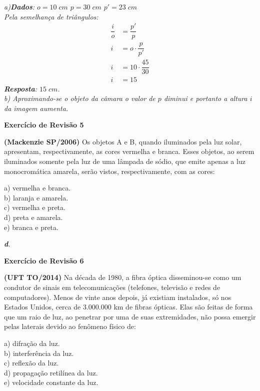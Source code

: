 \documentclass[11pt,twocolumn,oneside]{article}
\newenvironment{resposta*}
  {\bf Resposta:\\ }
  {}
\begin{document}
\begin{resposta*}
{\it a)\textbf{Dados}: $o=10\;cm$ $p=30\;cm$ $p'=23\;cm$ \\
Pela semelhança de triângulos:
\begin{align*}
    \dfrac{i}{o}    &= \dfrac{p'}{p} \\
    i               &= o\cdot \dfrac{p}{p'} \\
    i               &= 10\cdot \dfrac{45}{30} \\
    i               &= 15
\end{align*}
\textbf{Resposta}: $15\;cm$. \\
b) Aproximando-se o objeto da câmara o valor de $p$ diminui e portanto a altura $i$ da imagem aumenta.}
\end{resposta*}

\textbf{Exercício de Revisão 5}


\textbf{(Mackenzie SP/2006)} Os objetos A e B, quando iluminados pela luz solar, apresentam, respectivamente, as cores vermelha e branca. Esses objetos, ao serem iluminados somente pela luz de uma lâmpada de sódio, que emite apenas a luz monocromática amarela, serão vistos, respectivamente, com as cores:


a)	vermelha e branca. \\
b)	laranja e amarela. \\
c)	vermelha e preta. \\
d)	preta e amarela. \\
e)	branca e preta.


\begin{resposta*}
{\it \textbf{d}.}
\end{resposta*}

\textbf{Exercício de Revisão 6}


\textbf{(UFT TO/2014)} Na década de 1980, a fibra óptica disseminou-se como um condutor de sinais em telecomunicações (telefones, televisão e redes de computadores). Menos de vinte anos depois, já existiam instalados, só nos Estados Unidos, cerca de 3.000.000 km de fibras ópticas. Elas são feitas de forma que um raio de luz, ao penetrar por uma de suas extremidades, não possa emergir pelas laterais devido ao fenômeno físico de:


a)	difração da luz. \\
b)	interferência da luz. \\
c)	reflexão da luz. \\
d)	propagação retilínea da luz. \\
e)	velocidade constante da luz.
\end{document}
